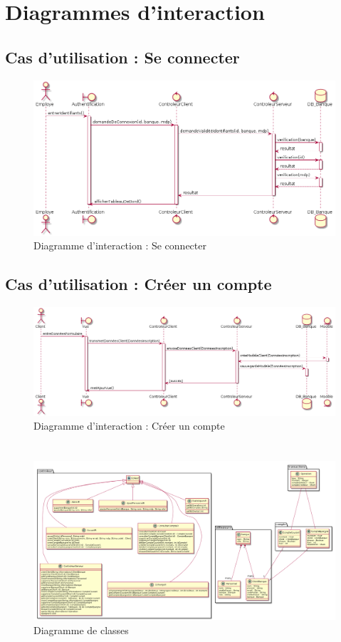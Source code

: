 \section{Diagrammes d'interaction}
\subsection{Cas d'utilisation : Se connecter}
\begin{figure}[h!]
\begin{center}
   \caption{Diagramme d'interaction : Se connecter}
   \includegraphics[scale=0.5]{images/seConnecterIR.png}
   \end{center}
\end{figure}
\subsection{Cas d'utilisation : Créer un compte}
\begin{figure}[h!]
\begin{center}
   \caption{Diagramme d'interaction : Créer un compte}
   \includegraphics[scale=0.4]{images/SInscrire.png}
   \end{center}
\end{figure}
\newpage
\section{{\color{orange}{Diagramme de classes de conception préliminaire}}}
\begin{figure}[h!]
\begin{center}
   \caption{Diagramme de classes}
   \includegraphics[scale=0.4, angle=90]{images/diagrammeClasses.png}
   \end{center}
\end{figure}
